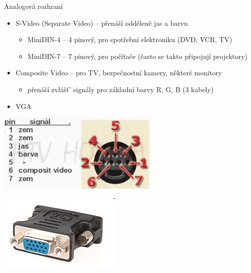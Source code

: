 \documentclass[aspectratio=43]{beamer}
\begin{document}
\begin{frame}{Analogová rozhraní}
	\begin{itemize}
		\item S-Video (Separate Video) – přenáší odděleně jas a barvu
		      \begin{itemize}
		      	\item MiniDIN-4 – 4 pinový, pro spotřební elektroniku (DVD, VCR, TV)
		      	\item MiniDIN-7 – 7 pinový, pro počítače (často se takto připojují projektory)
		      \end{itemize}
		\item Composite Video – pro TV, bezpečnostní kamery, některé monitory
		      \begin{itemize}
		      	\item přenáší  zvlášť’ signály pro základní barvy R, G, B (3 kabely)
		      \end{itemize}
		\item VGA
	\end{itemize}
	\begin{center}
		\begin{minipage}{0.3\linewidth}
			\centering
			\includegraphics[width=\linewidth]{extrahovane_obrazky/img_5_page4_1.png}
		\end{minipage}
		\hfill
		\begin{minipage}{0.3\linewidth}
			\centering
			\includegraphics[width=\linewidth]{extrahovane_obrazky/img_5_page4_4.jpeg}

\end{minipage}
\end{center}
\end{frame}
\end{document}
